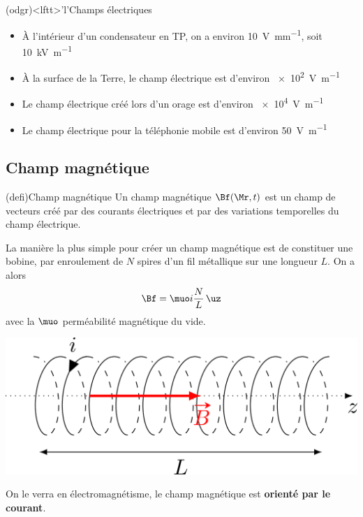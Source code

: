 \documentclass[../../main/main.tex]{subfiles}
\begin{document}
\begin{tcb*}(odgr)<lftt>'l'{Champs électriques}
	\begin{itemize}[label=$\diamond$]
		\item À l'intérieur d'un condensateur en TP, on a environ
		      \SI{10}{V.mm^{-1}}, soit \SI{10}{kV.m^{-1}}
		\item À la surface de la Terre, le champ électrique est d'environ
		      \SI{e2}{V.m^{-1}}
		\item Le champ électrique créé lors d'un orage est d'environ
		      \SI{e4}{V.m^{-1}}
		\item Le champ électrique pour la téléphonie mobile est d'environ
		      \SI{50}{V.m^{-1}}
	\end{itemize}
\end{tcb*}

\subsection{Champ magnétique}
\begin{tcb*}[sidebyside, righthand ratio=.3](defi){Champ magnétique}
	Un champ magnétique $\Bf(\Mr,t)$ est un champ de vecteurs créé par des
	courants électriques et par des variations temporelles du champ électrique.
	\tcblower
	\vspace{-15pt}
\end{tcb*}

\noindent
\begin{minipage}{0.65\linewidth}
	La manière la plus simple pour créer un champ magnétique est de constituer
	une bobine, par enroulement de $N$ spires d'un fil métallique sur une
	longueur $L$. On a alors
	\[\Bf = \muo i\frac{N}{L}\,\uz\]
	avec la $\muo$ perméabilité magnétique du vide.
\end{minipage}
\hfill
\begin{minipage}{0.33\linewidth}
	\begin{center}
		\includegraphics[width=\linewidth]{bobine_base}
		\captionsetup{justification=centering}
		\label{fig:bobine}
	\end{center}
\end{minipage}
On le verra en électromagnétisme, le champ magnétique est \textbf{orienté
	par le courant}.
\end{document}
